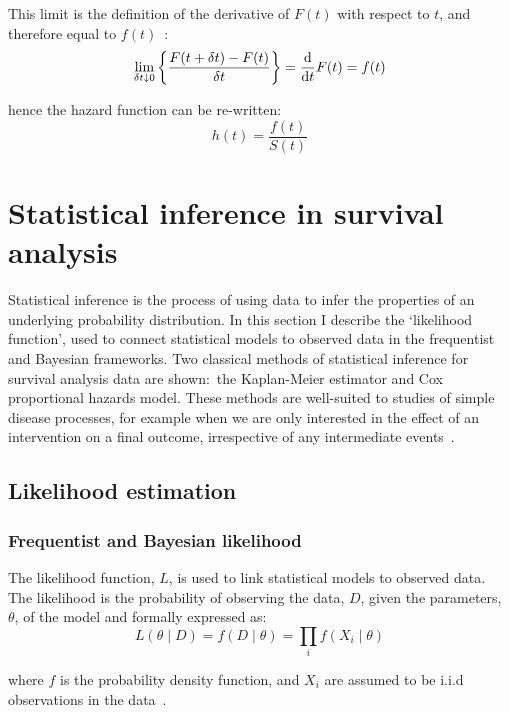 This limit is the definition of the derivative of $F(t)$ with respect to $t$, and therefore equal to $f(t)$~\parencite{Collett2023-bg}:
%
\[
    \lim_{\delta t \downarrow 0} \left\{\frac{F(t + \delta t) - F(t)}{\delta t}\right\} = \frac{\mathop{}\!\mathrm{d}}{\mathop{}\!\mathrm{d} t}F(t) = f(t)
\]

hence the hazard function can be re-written:
%
\begin{equation}
    h(t) = \frac{f(t)}{S(t)}
    \label{eq:hazard-survivor}
\end{equation}


\section{Statistical inference in survival analysis}

Statistical inference is the process of using data to infer the properties of an underlying probability distribution. In this section I describe the `likelihood function', used to connect statistical models to observed data in the frequentist and Bayesian frameworks. Two classical methods of statistical inference for survival analysis data are shown:\ the Kaplan-Meier estimator and Cox proportional hazards model. These methods are well-suited to studies of simple disease processes, for example when we are only interested in the effect of an intervention on a final outcome, irrespective of any intermediate events~\parencite{Austin2017-im}.

\subsection{Likelihood estimation}

\subsubsection{Frequentist and Bayesian likelihood}

The likelihood function, $L$, is used to link statistical models to observed data. The likelihood is the probability of observing the data, $D$, given the parameters, $\theta$, of the model and formally expressed as:
%
\[
    L(\theta \mid D) = f(D \mid \theta) = \prod_i f(X_i \mid \theta)
\]

where $f$ is the probability density function, and $X_i$ are assumed to be i.i.d observations in the data~\parencite{Wasserman2004-gw}.


